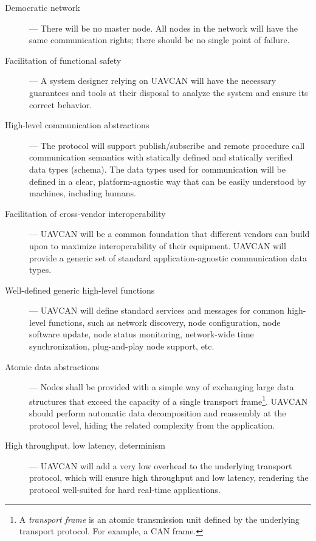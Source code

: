 \begin{description}
    \item[Democratic network] --- There will be no master node.
    All nodes in the network will have the same communication rights; there should be no single point of failure.

    \item[Facilitation of functional safety] --- A system designer relying on UAVCAN will have the necessary
    guarantees and tools at their disposal to analyze the system and ensure its correct behavior.

    \item[High-level communication abstractions] --- The protocol will support publish/subscribe and remote procedure
    call communication semantics with statically defined and statically verified data types (schema).
    The data types used for communication will be defined in a clear, platform-agnostic way
    that can be easily understood by machines, including humans.  %

    \item[Facilitation of cross-vendor interoperability] --- UAVCAN will be a common foundation that
    different vendors can build upon to maximize interoperability of their equipment.
    UAVCAN will provide a generic set of standard application-agnostic communication data types.

    \item[Well-defined generic high-level functions] --- UAVCAN will define standard services
    and messages for common high-level functions, such as network discovery, node configuration,
    node software update, node status monitoring, network-wide time synchronization, plug-and-play node support, etc.

    \item[Atomic data abstractions] --- Nodes shall be provided with a simple way of exchanging large
    data structures that exceed the capacity of a single transport frame\footnote{%
        A \emph{transport frame} is an atomic transmission unit defined by the underlying transport protocol.
        For example, a CAN frame.
    }.
    UAVCAN should perform automatic data decomposition and reassembly at the protocol level,
    hiding the related complexity from the application.

    \item[High throughput, low latency, determinism] --- UAVCAN will add a very low overhead to the underlying
    transport protocol, which will ensure high throughput and low latency, rendering the protocol well-suited
    for hard real-time applications.


\end{description}
